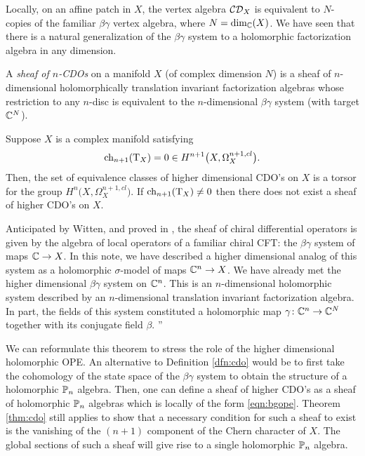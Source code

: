 \documentclass[11pt]{amsart}
\def\CDO{{\cC\cD}}
\begin{document}
Locally, on an affine patch in $X$, the vertex algebra $\CDO_X$ is equivalent to $N$-copies of the familiar $\beta\gamma$ vertex algebra, where $N = \dim_\mathbb C(X)$. 
We have seen that there is a natural generalization of the $\beta\gamma$ system to a holomorphic factorization algebra in any dimension. 

\begin{dfn}\label{dfn:cdo}
A {\em sheaf of $n$-CDOs} on a manifold $X$ (of complex dimension $N$) is a sheaf of $n$-dimensional holomorphically translation invariant factorization algebras whose restriction to any $n$-disc is equivalent to the $n$-dimensional $\beta\gamma$ system (with target $\mathbb C^N$). 
\end{dfn}

\begin{thm}\label{thm:cdo}
Suppose $X$ is a complex manifold satisfying 
\[
{\rm ch}_{n+1} ({\rm T}_X) = 0 \in H^{n+1} \big(X , \Omega^{n+1,cl}_X\big).
\]
Then, the set of equivalence classes of higher dimensional CDO's on $X$ is a torsor for the group $H^n \big(X , \Omega^{n+1, cl}_X\big)$. 
If ${\rm ch}_{n+1}({\rm T}_X) \ne 0$ then there does not exist a sheaf of higher CDO's on $X$. 
\end{thm}

Anticipated by Witten, and proved in \cite{GGW}, the sheaf of chiral differential operators is given by the algebra of local operators of a familiar chiral CFT: the $\beta\gamma$ system of maps $\mathbb C \to X$.
In this note, we have described a higher dimensional analog of this system as a holomorphic $\sigma$-model of maps $\mathbb C^n \to X$. 
We have already met the higher dimensional $\beta\gamma$ system on $\mathbb C^n$.
This is an $n$-dimensional holomorphic system described by an $n$-dimensional translation invariant factorization algebra.
In part, the fields of this system constituted a holomorphic map $\gamma \colon \mathbb C^n \to \mathbb C^N$ together with its conjugate field $\beta$. ''

We can reformulate this theorem to stress the role of the higher dimensional holomorphic OPE. 
An alternative to Definition \ref{dfn:cdo} would be to first take the cohomology of the state space of the $\beta\gamma$ system to obtain the structure of a holomorphic $\mathbb P_n$ algebra.
Then, one can define a sheaf of higher CDO's as a sheaf of holomorphic $\mathbb P_n$ algebras which is locally of the form \eqref{eqn:bgope}. 
Theorem \ref{thm:cdo} still applies to show that a necessary condition for such a sheaf to exist is the vanishing of the $(n+1)$ component of the Chern character of $X$. 
The global sections of such a sheaf will give rise to a single holomorphic $\mathbb P_n$ algebra. 
\end{document}
